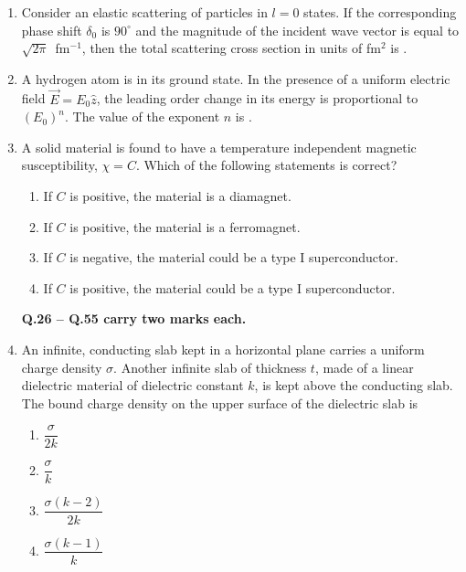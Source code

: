 \documentclass[journal,12pt,onecolumn]{IEEEtran}
\theoremstyle{remark}
\begin{document}
\begin{enumerate}
    



\item Consider an elastic scattering of particles in $l=0$ states. If the corresponding phase shift $\delta_0$ is $90^\circ$ and the magnitude of the incident wave vector is equal to $\sqrt{2\pi}$~fm$^{-1}$, then the total scattering cross section in units of fm$^2$ is \underline{\hspace{2cm}}.

\item A hydrogen atom is in its ground state. In the presence of a uniform electric field $\vec{E}=E_0\hat{z}$, the leading order change in its energy is proportional to $(E_0)^n$. The value of the exponent $n$ is \underline{\hspace{2cm}}.




\item A solid material is found to have a temperature independent magnetic susceptibility, $\chi = C$. Which of the following statements is correct?

\begin{enumerate}
    \item If $C$ is positive, the material is a diamagnet.
    \item If $C$ is positive, the material is a ferromagnet.
    \item If $C$ is negative, the material could be a type I superconductor.
    \item If $C$ is positive, the material could be a type I superconductor.
\end{enumerate}



\textbf{Q.26 -- Q.55 carry two marks each.}

\item An infinite, conducting slab kept in a horizontal plane carries a uniform charge density $\sigma$. Another infinite slab of thickness $t$, made of a linear dielectric material of dielectric constant $k$, is kept above the conducting slab. The bound charge density on the upper surface of the dielectric slab is

\begin{multicols}{2}
\begin{enumerate}
    \item $\dfrac{\sigma}{2k}$
    \item $\dfrac{\sigma}{k}$
    \item $\dfrac{\sigma (k - 2)}{2k}$
    \item $\dfrac{\sigma (k - 1)}{k}$
\end{enumerate}
\end{multicols}


\end{enumerate}
\end{document}

